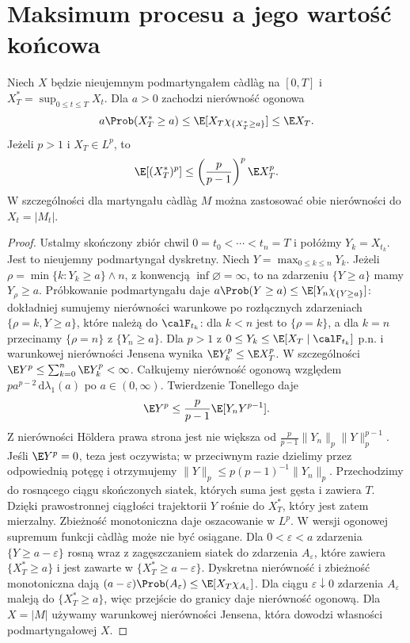 \section{Maksimum procesu a jego wartość końcowa}
\begin{twierdzenie}
\label{thm:doob-cont}
Niech $X$ będzie nieujemnym podmartyngałem c\`adl\`ag
na $[0,T]$ i $X_T^*=\sup_{0\le t\le T}X_t$.
Dla $a>0$ zachodzi nierówność ogonowa
\[
a\Prob(X_T^*\ge a)\le
\E[X_T\chi_{\{X_T^*\ge a\}}]\le\E X_T.
\]
Jeżeli $p>1$ i $X_T\in L^p$, to
\[
\E[(X_T^*)^p]\le
\left(\frac{p}{p-1}\right)^p\E X_T^p.
\]
W szczególności dla martyngału c\`adl\`ag $M$
można zastosować obie nierówności do $X_t=|M_t|$.
\end{twierdzenie}
\begin{proof}
Ustalmy skończony zbiór chwil
$0=t_0<\cdots<t_n=T$ i połóżmy $Y_k=X_{t_k}$.
Jest to nieujemny podmartyngał dyskretny.
Niech $Y=\max_{0\le k\le n}Y_k$.
Jeżeli $\rho=\min\{k:Y_k\ge a\}\wedge n$,
z konwencją $\inf\varnothing=\infty$,
to na zdarzeniu $\{Y\ge a\}$ mamy $Y_\rho\ge a$.
Próbkowanie podmartyngału daje
$a\Prob(Y\ge a)\le\E[Y_n\chi_{\{Y\ge a\}}]$:
dokładniej sumujemy nierówności warunkowe po rozłącznych
zdarzeniach $\{\rho=k,Y\ge a\}$, które należą
do $\calF_{t_k}$: dla $k<n$ jest to $\{\rho=k\}$,
a dla $k=n$ przecinamy $\{\rho=n\}$ z $\{Y_n\ge a\}$.
Dla $p>1$ z $0\le Y_k\le\E[X_T\mid\calF_{t_k}]$
p.n. i warunkowej nierówności Jensena wynika
$\E Y_k^p\le\E X_T^p$. W szczególności
$\E Y^p\le\sum_{k=0}^n\E Y_k^p<\infty$.
Całkujemy nierówność ogonową względem
$p a^{p-2}\,\mathrm d\lambda_1(a)$ po $a\in(0,\infty)$.
Twierdzenie Tonellego daje
\[
\E Y^p\le\frac{p}{p-1}\E[Y_nY^{p-1}].
\]
Z nierówności H\"oldera prawa strona jest nie większa od
$\frac{p}{p-1}\|Y_n\|_p\|Y\|_p^{p-1}$.
Jeśli $\E Y^p=0$, teza jest oczywista;
w przeciwnym razie dzielimy przez odpowiednią potęgę
i otrzymujemy $\|Y\|_p\le p(p-1)^{-1}\|Y_n\|_p$.
Przechodzimy do rosnącego ciągu skończonych siatek,
których suma jest gęsta i zawiera $T$.
Dzięki prawostronnej ciągłości trajektorii
$Y$ rośnie do $X_T^*$, który jest zatem mierzalny.
Zbieżność monotoniczna daje oszacowanie w $L^p$.
W wersji ogonowej supremum funkcji c\`adl\`ag
może nie być osiągane. Dla $0<\varepsilon<a$
zdarzenia $\{Y\ge a-\varepsilon\}$ rosną wraz
z zagęszczaniem siatek do zdarzenia $A_\varepsilon$,
które zawiera $\{X_T^*\ge a\}$ i jest zawarte
w $\{X_T^*\ge a-\varepsilon\}$.
Dyskretna nierówność i zbieżność monotoniczna
dają $(a-\varepsilon)\Prob(A_\varepsilon)
\le\E[X_T\chi_{A_\varepsilon}]$.
Dla ciągu $\varepsilon\downarrow0$ zdarzenia
$A_\varepsilon$ maleją do $\{X_T^*\ge a\}$,
więc przejście do granicy daje nierówność ogonową.
Dla $X=|M|$ używamy warunkowej nierówności Jensena,
która dowodzi własności podmartyngałowej $X$.
\end{proof}

